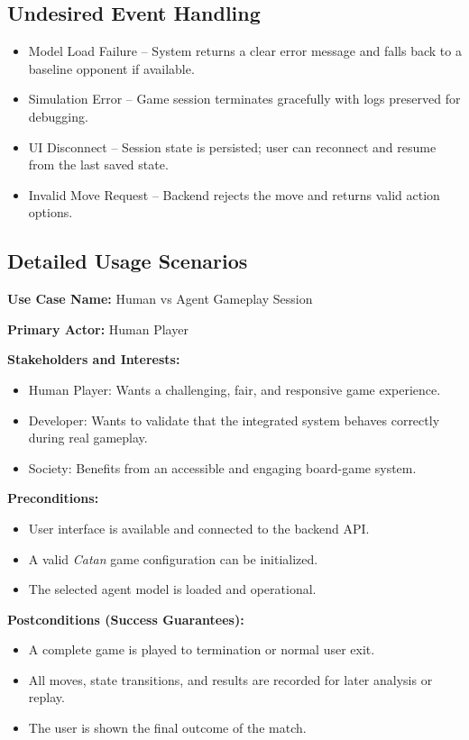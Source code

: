 \documentclass{article}
\begin{document}
\subsection{Undesired Event Handling}\label{subsec:undesired-event-handling}
\begin{itemize}
    \item {Model Load Failure} – System returns a clear error message and falls back to a baseline opponent if available.
    \item {Simulation Error} – Game session terminates gracefully with logs preserved for debugging.
    \item {UI Disconnect} – Session state is persisted; user can reconnect and resume from the last saved state.
    \item {Invalid Move Request} – Backend rejects the move and returns valid action options.
\end{itemize}


\subsection{Detailed Usage Scenarios}\label{subsec:detailed-usage-scenarios}

\noindent\textbf{Use Case Name:} Human vs \RL{} Agent Gameplay Session

\noindent\textbf{Primary Actor:} Human Player

\noindent\textbf{Stakeholders and Interests:}
\begin{itemize}
    \item Human Player: Wants a challenging, fair, and responsive game experience.
    \item Developer: Wants to validate that the integrated system behaves correctly during real gameplay.
    \item Society: Benefits from an accessible and engaging board-game \AI{} system.
\end{itemize}

\noindent\textbf{Preconditions:}
\begin{itemize}
    \item User interface is available and connected to the backend API.
    \item A valid \emph{Catan} game configuration can be initialized.
    \item The selected \RL{} agent model is loaded and operational.
\end{itemize}

\noindent\textbf{Postconditions (Success Guarantees):}
\begin{itemize}
    \item A complete game is played to termination or normal user exit.
    \item All moves, state transitions, and results are recorded for later analysis or replay.
    \item The user is shown the final outcome of the match.
\end{itemize}
\end{document}
